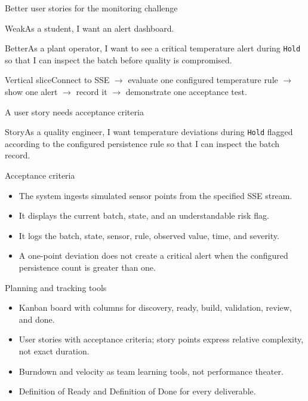 \begin{frame}{Better user stories for the monitoring challenge}
\begin{block}{Weak}As a student, I want an alert dashboard.\end{block}
\begin{block}{Better}As a plant operator, I want to see a critical temperature alert during \texttt{Hold} so that I can inspect the batch before quality is compromised.\end{block}
\begin{block}{Vertical slice}Connect to SSE $\rightarrow$ evaluate one configured temperature rule $\rightarrow$ show one alert $\rightarrow$ record it $\rightarrow$ demonstrate one acceptance test.\end{block}
\coursefooter
\end{frame}

\begin{frame}{A user story needs acceptance criteria}
\begin{block}{Story}As a quality engineer, I want temperature deviations during \texttt{Hold} flagged according to the configured persistence rule so that I can inspect the batch record.\end{block}
\begin{block}{Acceptance criteria}\begin{itemize}
\item The system ingests simulated sensor points from the specified SSE stream.
\item It displays the current batch, state, and an understandable risk flag.
\item It logs the batch, state, sensor, rule, observed value, time, and severity.
\item A one-point deviation does not create a critical alert when the configured persistence count is greater than one.
\end{itemize}\end{block}
\coursefooter
\end{frame}

\begin{frame}{Planning and tracking tools}
\begin{itemize}
\item Kanban board with columns for discovery, ready, build, validation, review, and done.
\item User stories with acceptance criteria; story points express relative complexity, not exact duration.
\item Burndown and velocity as team learning tools, not performance theater.
\item Definition of Ready and Definition of Done for every deliverable.
\end{itemize}
\coursefooter
\end{frame}

